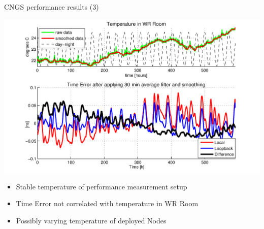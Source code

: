 \documentclass[compress,red]{beamer}
\begin{document}
\begin{frame}{CNGS performance results (3)}

	\begin{center}
		\includegraphics[height=0.6\textheight]{measurements/cngs_temp_vs_filteredTE3.pdf}
	
		\begin{itemize}
			\item Stable temperature of performance measurement setup
			\item Time Error not correlated with temperature in WR Room
			\item Possibly varying temperature of deployed Nodes
		\end{itemize}	
		
	\end{center}




\end{frame}

\end{document}
